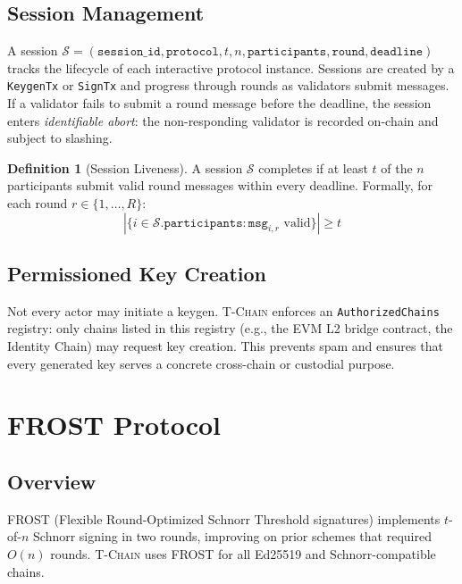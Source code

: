 \documentclass[11pt,letterpaper]{article}
\theoremstyle{definition}
\newtheorem{definition}{Definition}
\theoremstyle{remark}
\newcommand{\TChain}{\textsc{T-Chain}}
\newcommand{\FROST}{\textsc{FROST}}
\begin{document}
\subsection{Session Management}

A session $\mathcal{S} = (\texttt{session\_id}, \texttt{protocol}, t, n, \texttt{participants}, \texttt{round}, \texttt{deadline})$ tracks the lifecycle of each interactive protocol instance. Sessions are created by a \texttt{KeygenTx} or \texttt{SignTx} and progress through rounds as validators submit messages. If a validator fails to submit a round message before the deadline, the session enters \emph{identifiable abort}: the non-responding validator is recorded on-chain and subject to slashing.

\begin{definition}[Session Liveness]
A session $\mathcal{S}$ completes if at least $t$ of the $n$ participants submit valid round messages within every deadline. Formally, for each round $r \in \{1, \ldots, R\}$:
\[
|\{i \in \mathcal{S}.\texttt{participants} : \texttt{msg}_{i,r} \text{ valid} \}| \geq t
\]
\end{definition}

\subsection{Permissioned Key Creation}

Not every actor may initiate a keygen. \TChain{} enforces an \texttt{AuthorizedChains} registry: only chains listed in this registry (e.g., the EVM L2 bridge contract, the Identity Chain) may request key creation. This prevents spam and ensures that every generated key serves a concrete cross-chain or custodial purpose.

\section{FROST Protocol}
\label{sec:frost}

\subsection{Overview}

\FROST{} (Flexible Round-Optimized Schnorr Threshold signatures) \cite{komlo2020frost} implements $t$-of-$n$ Schnorr signing in two rounds, improving on prior schemes that required $O(n)$ rounds. \TChain{} uses \FROST{} for all Ed25519 and Schnorr-compatible chains.
\end{document}
